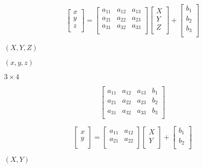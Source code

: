 \documentclass{article}
\begin{document}
\[ \begin{bmatrix} x\\ y\\ z\\ \end{bmatrix} = \begin{bmatrix} a_{11} & a_{12} & a_{13}\\ a_{21} & a_{22} & a_{23}\\ a_{31} & a_{32} & a_{33}\\ \end{bmatrix} \begin{bmatrix} X\\ Y\\ Z\\ \end{bmatrix} + \begin{bmatrix} b_1\\ b_2\\ b_3\\ \end{bmatrix} \]
\pagebreak

$(X,Y,Z)$
\pagebreak

$(x,y,z)$
\pagebreak

$3 \times 4$
\pagebreak

\[ \begin{bmatrix} a_{11} & a_{12} & a_{13} & b_1\\ a_{21} & a_{22} & a_{23} & b_2\\ a_{31} & a_{32} & a_{33} & b_3\\ \end{bmatrix} \]
\pagebreak

\[ \begin{bmatrix} x\\ y\\ \end{bmatrix} = \begin{bmatrix} a_{11} & a_{12}\\ a_{21} & a_{22}\\ \end{bmatrix} \begin{bmatrix} X\\ Y\\ \end{bmatrix} + \begin{bmatrix} b_1\\ b_2\\ \end{bmatrix} \]
\pagebreak

$(X,Y)$
\pagebreak
\end{document}
